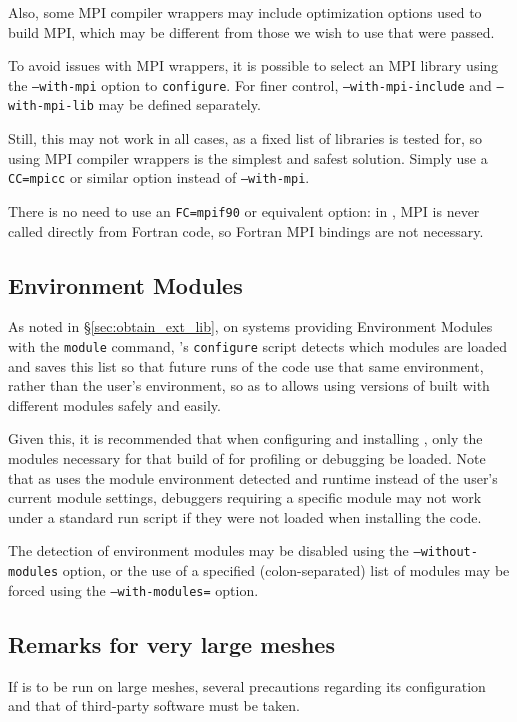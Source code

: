 \documentclass[a4paper,10pt,twoside]{csshortdoc}
\begin{document}
Also, some MPI compiler wrappers may include optimization options
used to build MPI, which may be different from those we wish to use
that were passed.

To avoid issues with MPI wrappers, it is possible to select an
MPI library using the \texttt{--with-mpi} option to \texttt{configure}.
For finer control, \texttt{--with-mpi-include} and \texttt{--with-mpi-lib}
may be defined separately.

Still, this may not work in all cases, as a fixed list of libraries
is tested for, so using MPI compiler wrappers is the simplest and safest
solution. Simply use a \texttt{CC=mpicc} or similar option instead
of \texttt{--with-mpi}.

There is no need to use an \texttt{FC=mpif90} or equivalent option:
in \CS, MPI is never called directly from Fortran code,
so Fortran MPI bindings are not necessary.

\subsection{Environment Modules\label{sec:config:envmode}}

As noted in \S\ref{sec:obtain_ext_lib}, on systems providing
Environment Modules with the {\tt module} command, \CS's {\tt configure}
script detects which modules are loaded and saves
this list so that future runs of the code use that same environment,
rather than the user's environment, so as to allows using versions of
\CS built with different modules safely and easily.

Given this, it is recommended that when configuring and installing
\CS, only the modules necessary for that build of for
profiling or debugging be loaded. Note that as \CS uses the module
environment detected and runtime instead of the user's current
module settings, debuggers requiring a specific module may
not work under a standard run script if they were not loaded when
installing the code.

The detection of environment modules may be disabled using the
\texttt{--without-modules} option,
or the use of a specified (colon-separated) list of modules
may be forced using the \texttt{--with-modules=} option.

\subsection{Remarks for very large meshes\label{sec:config:largemesh}}

If \CS is to be run on large meshes, several precautions regarding
its configuration and that of third-party software must be taken.
\end{document}
